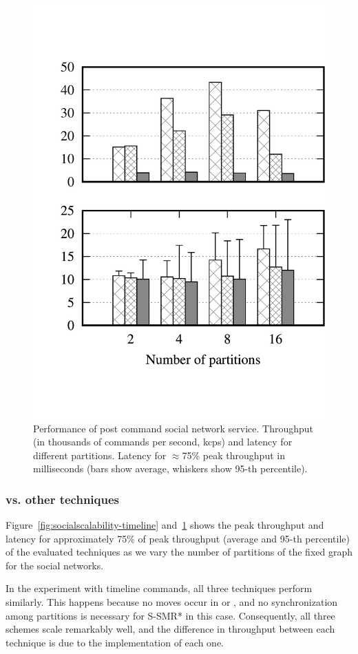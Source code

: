 \begin{figure}[ht!]
  \centering
    \includegraphics[width=0.6\columnwidth]{figures/experiments/dynastar/chirper-compare-mix-no-title}
  \caption{Performance of post command social network service. Throughput (in
  thousands of commands per second, kcps) and latency for different partitions.
  Latency for $\approx$75\% peak throughput in milliseconds (bars show average,
  whiskers show 95-th percentile).}
  \label{fig:socialscalability-mix}
\end{figure}

\subsubsection{\dynastar vs. other techniques}
\label{sec:dynastar-evaluation:results}

Figure~\ref{fig:socialscalability-timeline} and~\ref{fig:socialscalability-mix}
shows the peak throughput and latency for approximately 75\% of peak throughput
(average and 95-th percentile) of the evaluated techniques as we vary the number
of partitions of the fixed graph for the social networks.

In the experiment with timeline commands, all three techniques perform
similarly. This happens because no moves occur in \dynastar or \dssmr{}, and no
synchronization among partitions is necessary for S-SMR* in this case.
Consequently, all three schemes scale remarkably well, and the difference in
throughput between each technique is due to the implementation of each one.


